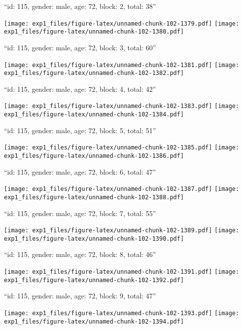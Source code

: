 \documentclass[11pt,,]{article}
\begin{document}
\newpage
[1] 

``id: 115, gender: male, age: 72, block: 2, total: 38''

\texttt{[image: exp1\_files/figure-latex/unnamed-chunk-102-1379.pdf]}
\texttt{[image: exp1\_files/figure-latex/unnamed-chunk-102-1380.pdf]}

\newpage
[1] 

``id: 115, gender: male, age: 72, block: 3, total: 60''

\texttt{[image: exp1\_files/figure-latex/unnamed-chunk-102-1381.pdf]}
\texttt{[image: exp1\_files/figure-latex/unnamed-chunk-102-1382.pdf]}

\newpage
[1] 

``id: 115, gender: male, age: 72, block: 4, total: 42''

\texttt{[image: exp1\_files/figure-latex/unnamed-chunk-102-1383.pdf]}
\texttt{[image: exp1\_files/figure-latex/unnamed-chunk-102-1384.pdf]}

\newpage
[1] 

``id: 115, gender: male, age: 72, block: 5, total: 51''

\texttt{[image: exp1\_files/figure-latex/unnamed-chunk-102-1385.pdf]}
\texttt{[image: exp1\_files/figure-latex/unnamed-chunk-102-1386.pdf]}

\newpage
[1] 

``id: 115, gender: male, age: 72, block: 6, total: 47''

\texttt{[image: exp1\_files/figure-latex/unnamed-chunk-102-1387.pdf]}
\texttt{[image: exp1\_files/figure-latex/unnamed-chunk-102-1388.pdf]}

\newpage
[1] 

``id: 115, gender: male, age: 72, block: 7, total: 55''

\texttt{[image: exp1\_files/figure-latex/unnamed-chunk-102-1389.pdf]}
\texttt{[image: exp1\_files/figure-latex/unnamed-chunk-102-1390.pdf]}

\newpage
[1] 

``id: 115, gender: male, age: 72, block: 8, total: 46''

\texttt{[image: exp1\_files/figure-latex/unnamed-chunk-102-1391.pdf]}
\texttt{[image: exp1\_files/figure-latex/unnamed-chunk-102-1392.pdf]}

\newpage
[1] 

``id: 115, gender: male, age: 72, block: 9, total: 47''

\texttt{[image: exp1\_files/figure-latex/unnamed-chunk-102-1393.pdf]}
\texttt{[image: exp1\_files/figure-latex/unnamed-chunk-102-1394.pdf]}
\end{document}
